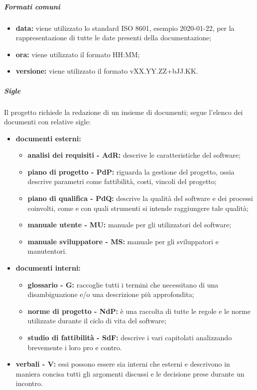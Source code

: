 				\subparagraph{Formati comuni}
					\begin{itemize}
						\item \textbf{data:} viene utilizzato lo standard ISO 8601, esempio 2020-01-22, per la rappresentazione di tutte le date presenti della documentazione;
						\item \textbf{ora:} viene utilizzato il formato HH:MM;
						\item \textbf{versione:} viene utilizzato il formato vXX.YY.ZZ+bJJ.KK.
					\end{itemize}
				\subparagraph{Sigle}
					Il progetto richiede la redazione di un insieme di documenti; segue l'elenco dei documenti con relative sigle:
					\begin{itemize}
						\item \textbf{documenti esterni:}
							\begin{itemize}
								\item \textbf{analisi dei requisiti - AdR:} descrive le caratteristiche del software;
								\item \textbf{piano di progetto - PdP:} riguarda la gestione del progetto, ossia descrive parametri come fattibilità, costi, vincoli del progetto;
								\item \textbf{piano di qualifica - PdQ:} descrive la qualità del software e dei processi coinvolti, come e con quali strumenti si intende raggiungere tale qualità;
								\item \textbf{manuale utente - MU:} manuale per gli utilizzatori del software;
								\item \textbf{manuale sviluppatore - MS:} manuale per gli sviluppatori e manutentori.
							\end{itemize}
						\item \textbf{documenti interni:}
							\begin{itemize}
								\item \textbf{glossario - G:} raccoglie tutti i termini che necessitano di una disambiguazione e/o una descrizione più approfondita;
								\item \textbf{norme di progetto - NdP:} è una raccolta di tutte le regole e le norme utilizzate durante il ciclo di vita del software;
								\item \textbf{studio di fattibilità - SdF:} descrive i vari capitolati analizzando brevemente i loro pro e contro.
							\end{itemize}
						\item \textbf{verbali - V:} essi possono essere sia interni che esterni e descrivono in maniera concisa tutti gli argomenti discussi e le decisione prese durante un incontro.
					\end{itemize}
